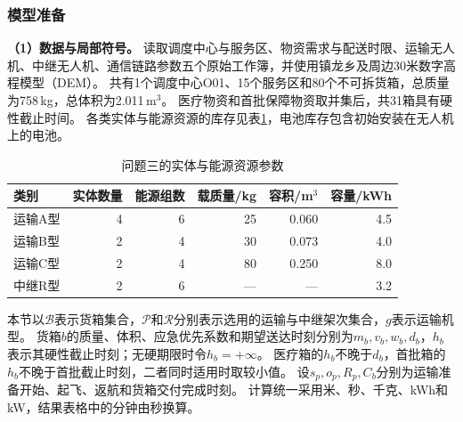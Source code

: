 \subsubsection{模型准备}
\label{sec:q3:preparation}

\textbf{（1）数据与局部符号。}
读取调度中心与服务区、物资需求与配送时限、运输无人机、中继无人机、通信链路参数五个原始工作簿，并使用镇龙乡及周边30米数字高程模型（DEM）。
共有1个调度中心O01、15个服务区和80个不可拆货箱，总质量为758\,kg，总体积为2.011\,m$^3$。
医疗物资和首批保障物资取并集后，共31箱具有硬性截止时间。
各类实体与能源资源的库存见表\ref{tab:q3:inventory}，电池库存包含初始安装在无人机上的电池。

\begin{table}[htbp]
  \centering
  \caption{问题三的实体与能源资源参数}
  \label{tab:q3:inventory}
  \begin{tabular}{lrrrrr}
    \toprule
    类别 & 实体数量 & 能源组数 & 载质量/kg & 容积/m$^3$ & 容量/kWh \\
    \midrule
    运输A型 & 4 & 6 & 25 & 0.060 & 4.5 \\
    运输B型 & 2 & 4 & 30 & 0.073 & 4.0 \\
    运输C型 & 2 & 4 & 80 & 0.250 & 8.0 \\
    中继R型 & 2 & 6 & --- & --- & 3.2 \\
    \bottomrule
  \end{tabular}
\end{table}

本节以$\mathcal B$表示货箱集合，$\mathcal P$和$\mathcal R$分别表示选用的运输与中继架次集合，$g$表示运输机型。
货箱$b$的质量、体积、应急优先系数和期望送达时刻分别为$m_b,v_b,w_b,d_b$，$h_b$表示其硬性截止时刻；无硬期限时令$h_b=+\infty$。
医疗箱的$h_b$不晚于$d_b$，首批箱的$h_b$不晚于首批截止时刻，二者同时适用时取较小值。
设$s_p,o_p,R_p,C_b$分别为运输准备开始、起飞、返航和货箱交付完成时刻。
计算统一采用米、秒、千克、kWh和kW，结果表格中的分钟由秒换算。

